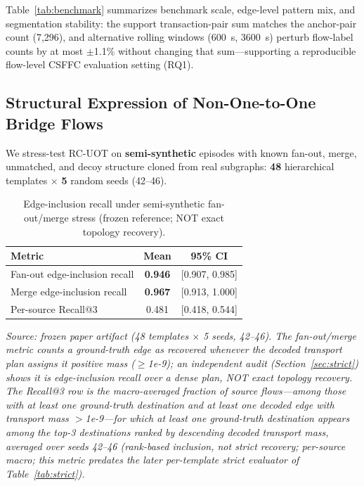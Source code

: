 Table~\ref{tab:benchmark} summarizes benchmark scale, edge-level pattern mix, and segmentation stability: the support transaction-pair sum matches the anchor-pair count (7{,}296), and alternative rolling windows (600~s, 3600~s) perturb flow-label counts by at most $\pm$1.1\% without changing that sum---supporting a reproducible flow-level CSFFC evaluation setting (RQ1).

\subsection{Structural Expression of Non-One-to-One Bridge Flows}
\label{sec:structural}

We stress-test RC-UOT on \textbf{semi-synthetic} episodes with known fan-out, merge, unmatched, and decoy structure cloned from real subgraphs: \textbf{48} hierarchical templates $\times$ \textbf{5} random seeds (42--46).

\begin{table}[!t]
\caption{Edge-inclusion recall under semi-synthetic fan-out/merge stress (frozen reference; NOT exact topology recovery).}
\label{tab:edgeinclusion}
\centering
\begin{tabular}{lcc}
\toprule
Metric & Mean & 95\% CI \\
\midrule
Fan-out edge-inclusion recall & \textbf{0.946} & [0.907, 0.985] \\
Merge edge-inclusion recall & \textbf{0.967} & [0.913, 1.000] \\
Per-source Recall@3 & 0.481 & [0.418, 0.544] \\
\bottomrule
\end{tabular}
\end{table}

\emph{Source: frozen paper artifact (48 templates $\times$ 5 seeds, 42--46). The fan-out/merge metric counts a ground-truth edge as recovered whenever the decoded transport plan assigns it positive mass ($\ge$1e-9); an independent audit (Section~\ref{sec:strict}) shows it is edge-inclusion recall over a dense plan, NOT exact topology recovery. The Recall@3 row is the macro-averaged fraction of source flows---among those with at least one ground-truth destination and at least one decoded edge with transport mass $>$1e-9---for which at least one ground-truth destination appears among the top-3 destinations ranked by descending decoded transport mass, averaged over seeds 42--46 (rank-based inclusion, not strict recovery; per-source macro; this metric predates the later per-template strict evaluator of Table~\ref{tab:strict}).}

